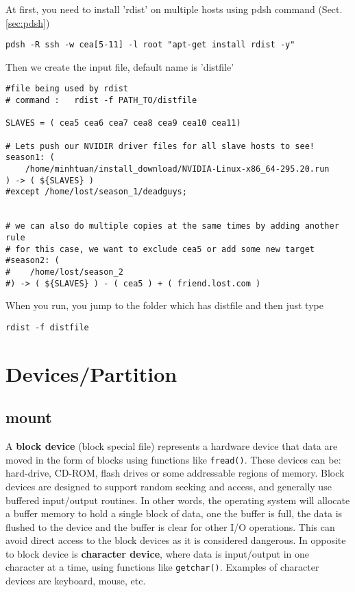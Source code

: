 At first, you need to install 'rdist' on multiple hosts using pdsh command
(Sect.\ref{sec:pdsh})
\begin{verbatim}
pdsh -R ssh -w cea[5-11] -l root "apt-get install rdist -y"
\end{verbatim}
Then we create the input file, default name is 'distfile'
{\tiny
\begin{verbatim}
#file being used by rdist
# command :   rdist -f PATH_TO/distfile

SLAVES = ( cea5 cea6 cea7 cea8 cea9 cea10 cea11)

# Lets push our NVIDIR driver files for all slave hosts to see!
season1: (
    /home/minhtuan/install_download/NVIDIA-Linux-x86_64-295.20.run
) -> ( ${SLAVES} )
#except /home/lost/season_1/deadguys;


# we can also do multiple copies at the same times by adding another rule
# for this case, we want to exclude cea5 or add some new target
#season2: (
#    /home/lost/season_2
#) -> ( ${SLAVES} ) - ( cea5 ) + ( friend.lost.com )
\end{verbatim}
}

When you run, you jump to the folder which has distfile and then just type
\begin{verbatim}
rdist -f distfile
\end{verbatim}


\section{Devices/Partition}

\subsection{mount}

A {\bf block device} (block special file) represents a hardware device that data
are moved in the form of blocks using functions like \verb!fread()!. These
devices can be: hard-drive, CD-ROM, flash drives or some addressable regions of
memory. Block devices are designed to support random seeking and access, and
generally use buffered input/output routines. In other words, the operating
system will allocate a buffer memory to hold a single block of data, one the
buffer is full, the data is flushed to the device and the buffer is clear for
other I/O operations. This can avoid direct access to the block devices as it is
considered dangerous. In opposite to block device is {\bf character device},
where data is input/output in one character at a time, using functions like
\verb!getchar()!. Examples of character devices are keyboard, mouse, etc. 


